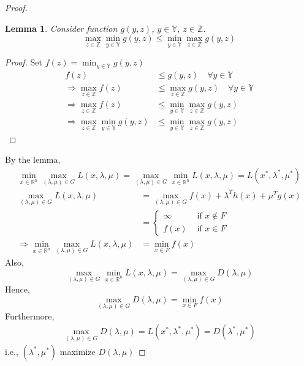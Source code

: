 \documentclass[11pt,a4paper]{article}
\newtheorem{lemma}{Lemma}
\begin{document}
\begin{proof}
\begin{lemma}
        Consider function $g(y,z)$, $y\in \mathbb{Y}$, $z\in \mathbb{Z}$.
        $$\max_{z\in \mathbb{Z}}\min_{y\in \mathbb{Y}}g(y,z)\leq\min_{y\in \mathbb{Y}}\max_{z\in \mathbb{Z}}g(y,z)$$
    \end{lemma}
    \begin{proof}
        Set $f(z)=\min_{y\in \mathbb{Y}}g(y,z)$
        \begin{equation}
            \begin{aligned}
                f(z)&\leq g(y,z)\quad \forall y\in \mathbb{Y}\\
                \Rightarrow \max_{z\in \mathbb{Z}}f(z)&\leq \max_{z\in \mathbb{Z}}g(y,z)\quad \forall y\in \mathbb{Y}\\
                \Rightarrow \max_{z\in \mathbb{Z}}f(z)&\leq \min_{y\in \mathbb{Y}}\max_{z\in \mathbb{Z}}g(y,z)\\
                \Rightarrow	\max_{z\in \mathbb{Z}}\min_{y\in \mathbb{Y}}g(y,z)&\leq\min_{y\in \mathbb{Y}}\max_{z\in \mathbb{Z}}g(y,z)
            \end{aligned}
            \nonumber
        \end{equation}
    \end{proof}
    By the lemma,
    \begin{equation}
        \begin{aligned}
            \min_{x\in \mathbb{R}^n}\max_{(\lambda,\mu)\in G}L(x,\lambda,\mu)= \max_{(\lambda,\mu)\in G}\min_{x\in \mathbb{R}^n}L(x,\lambda,\mu)= L(x^*,\lambda^*,\mu^*)
        \end{aligned}
        \nonumber
    \end{equation}
    \begin{equation}
        \begin{aligned}
            \max_{(\lambda,\mu)\in G}L(x,\lambda,\mu)&=\max_{(\lambda,\mu)\in G} f(x)+\lambda^T h(x)+\mu^T g(x)\\
            &=\left\{\begin{matrix}
                \infty&\text{ if }x\notin F\\
                f(x)&\text{ if }x\in F
            \end{matrix}\right.\\
            \Rightarrow	\min_{x\in \mathbb{R}^n}\max_{(\lambda,\mu)\in G}L(x,\lambda,\mu)&=\min_{x\in F}f(x)
        \end{aligned}
        \nonumber
    \end{equation}
    Also,
    $$\max_{(\lambda,\mu)\in G}\min_{x\in \mathbb{R}^n}L(x,\lambda,\mu)=\max_{(\lambda,\mu)\in G}D(\lambda,\mu)$$
    Hence,
    $$\max_{(\lambda,\mu)\in G}D(\lambda,\mu)=\min_{x\in F}f(x)$$
    Furthermore,
    \begin{equation}
        \begin{aligned}
            \max_{(\lambda,\mu)\in G}D(\lambda,\mu)=L(x^*,\lambda^*,\mu^*)=D(\lambda^*,\mu^*)
        \end{aligned}
        \nonumber
    \end{equation}
    i.e., $(\lambda^*,\mu^*)$ maximize $D(\lambda,\mu)$
\end{proof}
\end{document}

